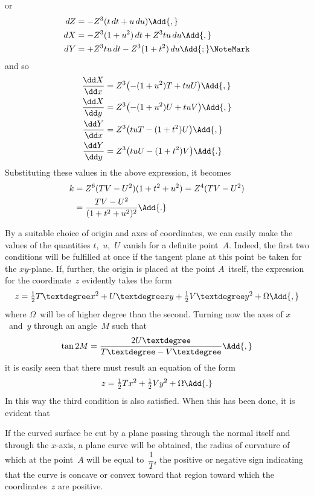or
\begin{align*}
dZ &= -Z^{3}(t\, dt + u\, du)\Add{,} \\
dX &= -Z^{3}(1 + u^{2})\, dt + Z^{3} tu\, du\Add{,} \\
dY &= +Z^{3}tu\, dt - Z^{3}(1 + t^{2})\, du\Add{;}\NoteMark
\end{align*}
and so
\begin{align*}
\frac{\dd X}{\dd x} &= Z^{3}\bigl(-(1 + u^{2})T + tuU\bigr)\Add{,} \\
\frac{\dd X}{\dd y} &= Z^{3}\bigl(-(1 + u^{2})U + tuV\bigr)\Add{,} \\
\frac{\dd Y}{\dd x} &= Z^{3}\bigl( tuT - (1 + t^{2})U\bigr)\Add{,} \\
\frac{\dd Y}{\dd y} &= Z^{3}\bigl( tuU - (1 + t^{2})V\bigr)\Add{.}
\end{align*}
Substituting these values in the above expression, it becomes
\begin{align*}
k &= Z^{6}(TV - U^{2}) (1 + t^{2} + u^{2}) = Z^{4} (TV - U^{2}) \\
  &= \frac{TV - U^{2}}{(1 + t^{2} + u^{2})^{2}}\Add{.}
\end{align*}



By a suitable choice of origin and axes of coordinates, we can easily make the
values of the quantities $t$,~$u$,~$U$ vanish for a definite point~$A$. Indeed, the first two
conditions will be fulfilled at once if the tangent plane at this point be taken for the
$xy$-plane. If, further, the origin is placed at the point $A$~itself, the expression for
the coordinate~$z$ evidently takes the form
\[
z = \tfrac{1}{2}T°x^{2} + U°xy + \tfrac{1}{2}V°y^{2} + \Omega\Add{,}
\]
where $\Omega$~will be of higher degree than the second. Turning now the axes of $x$~and~$y$
through an angle~$M$ such that
\[
\tan 2M = \frac{2U°}{T° - V°}\Add{,}
\]
it is easily seen that there must result an equation of the form
\[
z = \tfrac{1}{2}Tx^{2} + \tfrac{1}{2}Vy^{2} + \Omega\Add{.}
\]
In this way the third condition is also satisfied. When this has been done, it is evident
that

 If the curved surface be cut by a plane passing through the normal itself and
through the $x$-axis, a plane curve will be obtained, the radius of curvature of which
at the point~$A$ will be equal to~$\dfrac{1}{T}$, the positive or negative sign indicating that the
curve is concave or convex toward that region toward which the coordinates~$z$ are
positive.

